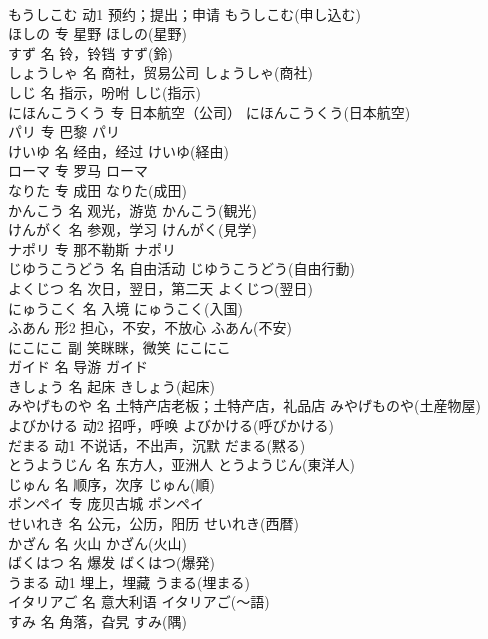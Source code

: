 \documentclass[8pt]{extreport}
\begin{document}
\begin{CJK}{UTF8}{min}
\\	もうしこむ	动1	预约；提出；申请	もうしこむ(申し込む)	
\\	ほしの	专	星野	ほしの(星野)	
\\	すず	名	铃，铃铛	すず(鈴)	
\\	しょうしゃ	名	商社，贸易公司	しょうしゃ(商社)	
\\	しじ	名	指示，吩咐	しじ(指示)	
\\	にほんこうくう	专	日本航空（公司）	にほんこうくう(日本航空)	
\\	パリ	专	巴黎	パリ	
\\	けいゆ	名	经由，经过	けいゆ(経由)	
\\	ローマ	专	罗马	ローマ	
\\	なりた	专	成田	なりた(成田)	
\\	かんこう	名	观光，游览	かんこう(観光)	
\\	けんがく	名	参观，学习	けんがく(見学)	
\\	ナポリ	专	那不勒斯	ナポリ	
\\	じゆうこうどう	名	自由活动	じゆうこうどう(自由行動)	
\\	よくじつ	名	次日，翌日，第二天	よくじつ(翌日)	
\\	にゅうこく	名	入境	にゅうこく(入国)	
\\	ふあん	形2	担心，不安，不放心	ふあん(不安)	
\\	にこにこ	副	笑眯眯，微笑	にこにこ	
\\	ガイド	名	导游	ガイド	
\\	きしょう	名	起床	きしょう(起床)	
\\	みやげものや	名	土特产店老板；土特产店，礼品店	みやげものや(土産物屋)	
\\	よびかける	动2	招呼，呼唤	よびかける(呼びかける)	
\\	だまる	动1	不说话，不出声，沉默	だまる(黙る)	
\\	とうようじん	名	东方人，亚洲人	とうようじん(東洋人)	
\\	じゅん	名	顺序，次序	じゅん(順)	
\\	ポンペイ	专	庞贝古城	ポンペイ	
\\	せいれき	名	公元，公历，阳历	せいれき(西暦)	
\\	かざん	名	火山	かざん(火山)	
\\	ばくはつ	名	爆发	ばくはつ(爆発)	
\\	うまる	动1	埋上，埋藏	うまる(埋まる)	
\\	イタリアご	名	意大利语	イタリアご(～語)	
\\	すみ	名	角落，旮旯	すみ(隅)	

\end{CJK}
\end{document}
